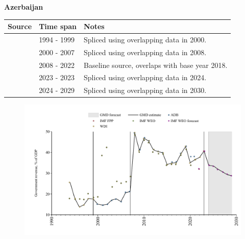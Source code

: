 \documentclass[12pt,a4paper,landscape]{article}
\begin{document}
\begin{adjustbox}{max totalsize={\paperwidth}{\paperheight},center}
\begin{minipage}[t][\textheight][t]{\textwidth}
\vspace*{0.5cm}
{}
\begin{center}
{\Large\bfseries Azerbaijan}
\end{center}
\vspace{0.5cm}
\begin{table}[H]
\centering
\small
\begin{tabular}{|l|l|l|}
\hline
\textbf{Source} & \textbf{Time span} & \textbf{Notes} \\
\hline
\rowcolor{white}\cite{WDI}& 1994 - 1999 &Spliced using overlapping data in 2000.\\
\rowcolor{lightgray}\cite{ADB}& 2000 - 2007 &Spliced using overlapping data in 2008.\\
\rowcolor{white}\cite{WDI}& 2008 - 2022 &Baseline source, overlaps with base year 2018.\\
\rowcolor{lightgray}\cite{IMF_FPP}& 2023 - 2023 &Spliced using overlapping data in 2024.\\
\rowcolor{white}\cite{IMF_WEO_forecast}& 2024 - 2029 &Spliced using overlapping data in 2030.\\
\hline
\end{tabular}
\end{table}
\begin{figure}[H]
\centering
\includegraphics[width=\textwidth,height=0.6\textheight,keepaspectratio]{graphs/AZE_govrev_GDP.pdf}
\end{figure}
\end{minipage}
\end{adjustbox}
\end{document}
